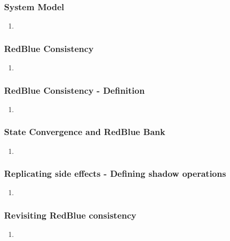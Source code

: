 \documentclass{beamer}
\begin{document}

\begin{frame}
\frametitle{System Model}
\begin{enumerate}
\item
\end{enumerate}

\end{frame}


\begin{frame}
\frametitle{RedBlue Consistency}
\begin{enumerate}
\item
\end{enumerate}

\end{frame}



\begin{frame}
\frametitle{RedBlue Consistency - Definition}
\begin{enumerate}
\item
\end{enumerate}

\end{frame}


\begin{frame}
\frametitle{State Convergence and RedBlue Bank}
\begin{enumerate}
\item
\end{enumerate}

\end{frame}


\begin{frame}
\frametitle{Replicating side effects - Defining shadow operations}
\begin{enumerate}
\item
\end{enumerate}

\end{frame}


\begin{frame}
\frametitle{Revisiting RedBlue consistency}
\begin{enumerate}
\item
\end{enumerate}

\end{frame}
\end{document}
